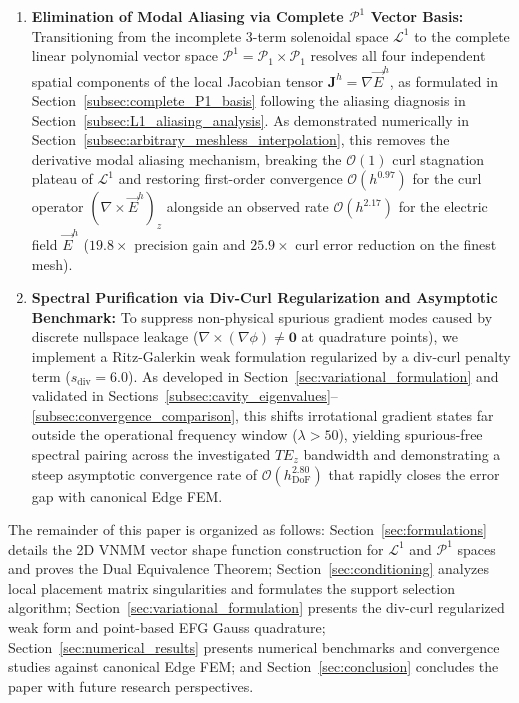 \documentclass[preprint,12pt]{elsarticle}
\begin{document}
\begin{enumerate}
    \item \textbf{Elimination of Modal Aliasing via Complete $\mathcal{P}^1$ Vector Basis:} Transitioning from the incomplete 3-term solenoidal space $\mathcal{L}^1$ to the complete linear polynomial vector space $\mathcal{P}^1 = \mathcal{P}_1 \times \mathcal{P}_1$ resolves all four independent spatial components of the local Jacobian tensor $\mathbf{J}^h = \nabla \vec{E}^h$, as formulated in Section~\ref{subsec:complete_P1_basis} following the aliasing diagnosis in Section~\ref{subsec:L1_aliasing_analysis}. As demonstrated numerically in Section~\ref{subsec:arbitrary_meshless_interpolation}, this removes the derivative modal aliasing mechanism, breaking the $\mathcal{O}(1)$ curl stagnation plateau of $\mathcal{L}^1$ and restoring first-order convergence $\mathcal{O}(h^{0.97})$ for the curl operator $(\nabla \times \vec{E}^h)_z$ alongside an observed rate $\mathcal{O}(h^{2.17})$ for the electric field $\vec{E}^h$ ($19.8\times$ precision gain and $25.9\times$ curl error reduction on the finest mesh).
    
    \item \textbf{Spectral Purification via Div-Curl Regularization and Asymptotic Benchmark:} To suppress non-physical spurious gradient modes caused by discrete nullspace leakage ($\nabla \times (\nabla \phi) \neq \mathbf{0}$ at quadrature points), we implement a Ritz-Galerkin weak formulation regularized by a div-curl penalty term ($s_{\mathrm{div}} = 6.0$). As developed in Section~\ref{sec:variational_formulation} and validated in Sections~\ref{subsec:cavity_eigenvalues}--\ref{subsec:convergence_comparison}, this shifts irrotational gradient states far outside the operational frequency window ($\lambda > 50$), yielding spurious-free spectral pairing across the investigated $TE_z$ bandwidth and demonstrating a steep asymptotic convergence rate of $\mathcal{O}(h_{\mathrm{DoF}}^{2.80})$ that rapidly closes the error gap with canonical Edge FEM.
\end{enumerate}


The remainder of this paper is organized as follows: Section~\ref{sec:formulations} details the 2D VNMM vector shape function construction for $\mathcal{L}^1$ and $\mathcal{P}^1$ spaces and proves the Dual Equivalence Theorem; Section~\ref{sec:conditioning} analyzes local placement matrix singularities and formulates the support selection algorithm; Section~\ref{sec:variational_formulation} presents the div-curl regularized weak form and point-based EFG Gauss quadrature; Section~\ref{sec:numerical_results} presents numerical benchmarks and convergence studies against canonical Edge FEM; and Section~\ref{sec:conclusion} concludes the paper with future research perspectives.
\end{document}
